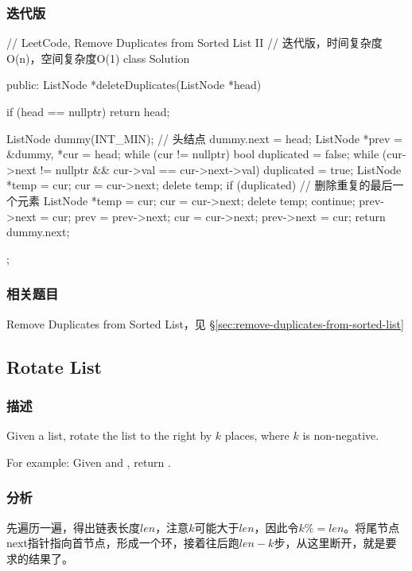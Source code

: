 \subsubsection{迭代版}
\begin{Code}
// LeetCode, Remove Duplicates from Sorted List II
// 迭代版，时间复杂度O(n)，空间复杂度O(1)
class Solution {
public:
    ListNode *deleteDuplicates(ListNode *head) {
        if (head == nullptr) return head;

        ListNode dummy(INT_MIN); // 头结点
        dummy.next = head;
        ListNode *prev = &dummy, *cur = head;
        while (cur != nullptr) {
            bool duplicated = false;
            while (cur->next != nullptr && cur->val == cur->next->val) {
                duplicated = true;
                ListNode *temp = cur;
                cur = cur->next;
                delete temp;
            }
            if (duplicated) { // 删除重复的最后一个元素
                ListNode *temp = cur;
                cur = cur->next;
                delete temp;
                continue;
            }
            prev->next = cur;
            prev = prev->next;
            cur = cur->next;
        }
        prev->next = cur;
        return dummy.next;
    }
};
\end{Code}


\subsubsection{相关题目}

\begindot
\item Remove Duplicates from Sorted List，见 \S \ref{sec:remove-duplicates-from-sorted-list}
\myenddot


\subsection{Rotate List}
\label{sec:rotate-list}


\subsubsection{描述}
Given a list, rotate the list to the right by $k$ places, where $k$ is non-negative.

For example:
Given  and , return .


\subsubsection{分析}
先遍历一遍，得出链表长度$len$，注意$k$可能大于$len$，因此令$k \%= len$。将尾节点next指针指向首节点，形成一个环，接着往后跑$len-k$步，从这里断开，就是要求的结果了。


